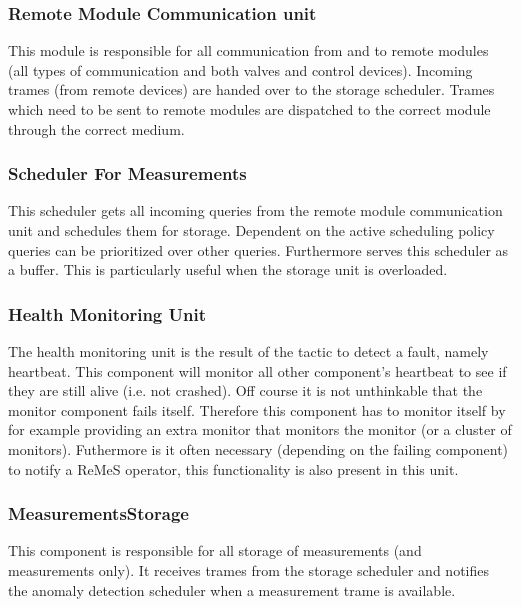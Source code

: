 
\subsubsection{Remote Module Communication unit}

\npar This module is responsible for all communication from and to remote
modules (all types of communication and both valves and control devices).
Incoming trames (from remote devices) are handed over to the storage scheduler.
Trames which need to be sent to remote modules are dispatched to the correct
module through the correct medium.

\subsubsection{Scheduler For Measurements}

\npar This scheduler gets all incoming queries from the remote module
communication unit and schedules them for storage. Dependent on the active
scheduling policy queries can be prioritized over other queries. Furthermore
serves this scheduler as a buffer. This is particularly useful when the storage
unit is overloaded.

\subsubsection{Health Monitoring Unit}

\npar The health monitoring unit is the result of the tactic to detect a
fault, namely heartbeat. This component will monitor all other component's
heartbeat to see if they are still alive (i.e. not crashed). Off course it is
not unthinkable that the monitor component fails itself. Therefore this
component has to monitor itself by for example providing an extra monitor that
monitors the monitor (or a cluster of monitors). Futhermore is it often
necessary (depending on the failing component) to notify a ReMeS operator, this
functionality is also present in this unit.

\subsubsection{MeasurementsStorage}

\npar This component is responsible for all storage of measurements (and
measurements only). It receives trames from the storage scheduler and notifies
the anomaly detection scheduler when a measurement trame is available.

